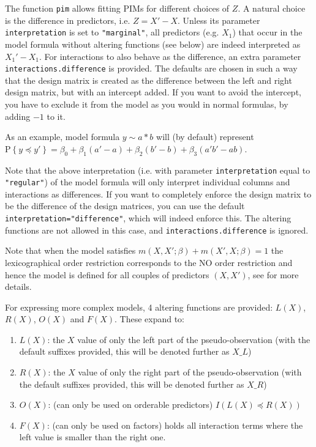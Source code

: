 \documentclass[12pt]{article}
\newcommand{\prob}[1]{\text{P}\left\{#1\right\}}
\newcommand{\leqs}{\preccurlyeq}
\newcommand{\pim}[1]{\texttt{#1}}%
\newcommand{\cd}[1]{\texttt{#1}}%
\begin{document}
The function \pim{pim} allows fitting PIMs for different choices of $Z$. A natural choice is the difference in predictors, i.e. $Z = X' - X$. Unless its parameter \cd{interpretation} is set to \cd{"marginal"}, all predictors (e.g. $X_1$) that occur in the model formula without altering functions (see below) are indeed interpreted as $X_1' - X_1$. For interactions to also behave as the difference, an extra parameter \cd{interactions.difference} is provided. The defaults are chosen in such a way that the design matrix is created as the difference between the left and right design matrix, but with an intercept added. If you want to avoid the intercept, you have to exclude it from the model as you would in normal formulas, by adding $-1$ to it.

As an example, model formula $y\sim a*b$ will (by default) represent $\prob{y \leqs y' }=\beta_0+\beta_1  (a'-a) + \beta_2  (b'-b) + \beta_3  (a'b' - ab)$.

Note that the above interpretation (i.e. with parameter \cd{interpretation} equal to \cd{"regular"}) of the model formula will only interpret individual columns and interactions as differences. If you want to completely enforce the design matrix to be the difference of the design matrices, you can use the default \cd{interpretation="difference"}, which will indeed enforce this. The altering functions are not allowed in this case, and \cd{interactions.difference} is ignored.

Note that when the model satisfies $m(X,X';\beta) + m(X',X;\beta) = 1$ the lexicographical order restriction corresponds to the NO order restriction and hence the model is defined for all couples of predictors $(X,X')$, see \cite{Thas2012} for more details. 

For expressing more complex models, 4 altering functions are provided: $L(X)$, $R(X)$, $O(X)$ and $F(X)$. These expand to:
\begin{enumerate}
\item $L(X)$: the $X$ value of only the left part of the pseudo-observation (with the default suffixes provided, this will be denoted further as $X \_ L$)
\item $R(X)$: the $X$ value of only the right part of the pseudo-observation (with the default suffixes provided, this will be denoted further as $X \_ R$)
\item $O(X)$: (can only be used on orderable predictors) $I\left( L(X) \leqs R(X) \right)$
\item $F(X)$: (can only be used on factors) holds all interaction terms where the left value is smaller than the right one.
\end{enumerate} 
\end{document}
